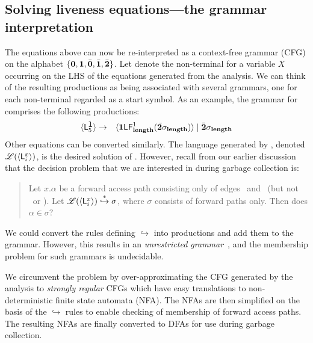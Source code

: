 \documentclass[9pt]{sigplanconf}
\newcommand{\comment}[1]{{\color{Myblue}{(#1)}}}
\begin{document}
\subsection{Solving liveness equations---the grammar
interpretation}\label{sec:grammar-formulation}
The  equations above can now be re-interpreted as a
context-free grammar (CFG)  on the alphabet $\lbrace\mathbf{0}, \mathbf{1},
\bar{\mathbf{0}}, \bar{\mathbf{1}}, \bar{\mathbf{2}}\rbrace$.  Let   denote the non-terminal
for
a variable  $X$ occurring on  the LHS of the  equations generated
from the analysis.  We can  think of the resulting productions as
being associated with several  grammars, one for each non-terminal
 regarded as a start symbol.  As an example, the
grammar    for      comprises    the   following
productions:
 \begin{eqnarray*}
\var{\Lanv{5}{\xl}}  &\rightarrow&   \var{\acdr \Lf
  {\length}{1}{\cbar\sigma_{\length}}} \mid \cbar\sigma_{\length} \\
\end{eqnarray*}
\comment{Pick up a richer equation or more than one liveness equations}
Other equations can be converted  similarly.     The  language
generated  by  ,
denoted $\mathscr{L}(\var{\Lanv{i}{x}})
$,  is the desired  solution of
.
However, recall from  our earlier  discussion that
the  decision problem that  we are  interested in  during garbage
collection is:
\begin{quote}
Let $x.\alpha$ be  a forward  access path  consisting  only  of   edges
\acar\  and \acdr\  (but  not \bcar\  or  \bcdr).   Let
$\mathscr{L}(\var{\Lanv{i}{x}})
\stackrel{*}{\hookrightarrow} \sigma$, where  $\sigma$  consists
of forward paths only. Then does $\alpha \in \sigma$?
\end{quote}
We could convert  the  rules  defining  $\hookrightarrow$  into
productions and  add them to the grammar. However, this results
in  an {\em  unrestricted grammar}~\cite{hopcraft90toc},  and the
membership  problem   for  such  grammars   is
undecidable. \comment{Rewrite it to say that this is a CFG with 3
  unrestricted rules and the membership for even this grammar is
undecidable}
\comment{State the undecidability of the decision problem above.}

  We circumvent the problem by over-approximating the CFG generated by
the analysis to  {\em
  strongly  regular}  CFGs which  have   easy
translations to non-deterministic finite state automata (NFA). The
NFAs are then simplified on the
basis  of  the  $\hookrightarrow$  rules to  enable  checking  of
membership of forward access paths. The resulting NFAs are   finally
converted to DFAs for use during garbage collection.
\comment{Fix all comments and produce first draft}
\end{document}

